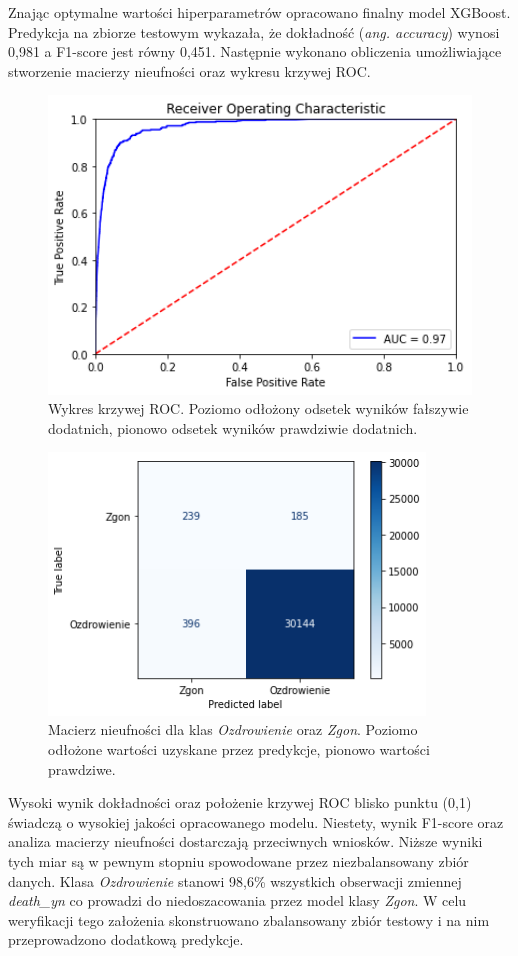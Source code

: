 \documentclass[polish, twoside, 12pt, a4paper]{article}
\theoremstyle{definition}
\theoremstyle{plain}
\theoremstyle{remark}
\begin{document}
Znając optymalne wartości hiperparametrów opracowano finalny model XGBoost. Predykcja na zbiorze testowym wykazała, że dokładność (\emph{ang. accuracy}) wynosi 0,981 a F1-score jest równy 0,451. Następnie wykonano obliczenia umożliwiające stworzenie macierzy nieufności oraz wykresu krzywej ROC.

\begin{figure}[H]
\centering
\includegraphics[width=15cm]{roc.png}
\caption{Wykres krzywej ROC. Poziomo odłożony odsetek wyników fałszywie dodatnich, pionowo odsetek wyników prawdziwie dodatnich. }
\end{figure}


\begin{figure}[H]
\centering
\includegraphics[width=10cm]{conf_matrix.png}
\caption{Macierz nieufności dla klas \emph{Ozdrowienie} oraz \emph{Zgon}. Poziomo odłożone wartości uzyskane przez predykcje, pionowo wartości prawdziwe. }
\end{figure}

Wysoki wynik dokładności oraz położenie krzywej ROC blisko punktu (0,1) świadczą o wysokiej jakości opracowanego modelu. Niestety, wynik F1-score oraz analiza macierzy nieufności dostarczają przeciwnych wniosków. Niższe wyniki tych miar są w pewnym stopniu spowodowane przez niezbalansowany zbiór danych. Klasa \emph{Ozdrowienie} stanowi 98,6\% wszystkich obserwacji zmiennej \emph{death\_yn} co prowadzi do niedoszacowania przez model klasy \emph{Zgon}. W celu weryfikacji tego założenia skonstruowano zbalansowany zbiór testowy i na nim przeprowadzono dodatkową predykcje. 
\end{document}
